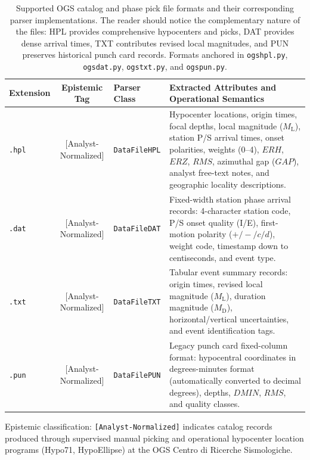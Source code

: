 \begin{table}[htbp]
  \centering
  \small
  \caption{Supported OGS catalog and phase pick file formats and their corresponding parser implementations. The reader should notice the complementary nature of the files: HPL provides comprehensive hypocenters and picks, DAT provides dense arrival times, TXT contributes revised local magnitudes, and PUN preserves historical punch card records. Formats anchored in \texttt{ogshpl.py}, \texttt{ogsdat.py}, \texttt{ogstxt.py}, and \texttt{ogspun.py}.}
  \label{tab:file_formats}
  \begin{threeparttable}
    \begin{tabularx}{\linewidth}{l c l X}
      \toprule
      \textbf{Extension} & \textbf{Epistemic Tag\tnote{a}} & \textbf{Parser Class} & \textbf{Extracted Attributes and Operational Semantics} \\
      \midrule
      \texttt{.hpl} & [Analyst-Normalized] & \texttt{DataFileHPL} & Hypocenter locations, origin times, focal depths, local magnitude ($M_{\mathrm{L}}$), station P/S arrival times, onset polarities, weights (0--4), $ERH$, $ERZ$, $RMS$, azimuthal gap ($GAP$), analyst free-text notes, and geographic locality descriptions. \\
      \texttt{.dat} & [Analyst-Normalized] & \texttt{DataFileDAT} & Fixed-width station phase arrival records: 4-character station code, P/S onset quality (I/E), first-motion polarity ($+/-/c/d$), weight code, timestamp down to centiseconds, and event type. \\
      \texttt{.txt} & [Analyst-Normalized] & \texttt{DataFileTXT} & Tabular event summary records: origin times, revised local magnitude ($M_{\mathrm{L}}$), duration magnitude ($M_{\mathrm{D}}$), horizontal/vertical uncertainties, and event identification tags. \\
      \texttt{.pun} & [Analyst-Normalized] & \texttt{DataFilePUN} & Legacy punch card fixed-column format: hypocentral coordinates in degrees-minutes format (automatically converted to decimal degrees), depths, $DMIN$, $RMS$, and quality classes. \\
      \bottomrule
    \end{tabularx}
    \begin{tablenotes}[flushleft]
      \footnotesize
      \item[a] Epistemic classification: \texttt{[Analyst-Normalized]} indicates catalog records produced through supervised manual picking and operational hypocenter location programs (Hypo71, HypoEllipse) at the OGS Centro di Ricerche Sismologiche.
    \end{tablenotes}
  \end{threeparttable}
\end{table}

